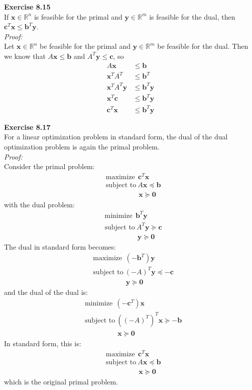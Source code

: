 \documentclass[letterpaper,12pt]{article}
\let\vec\mathbf
\theoremstyle{definition}
\begin{document}
\textbf{Exercise 8.15} \\
If $\vec{x} \in \mathbb{R}^n$ is feasible for the primal and $\vec{y} \in \mathbb{R}^m$ is feasible for the dual, then $\vec{c}^T\vec{x} \leq \vec{b}^T\vec{y}$. \\
\textit{Proof:} \\
Let $\vec{x} \in \mathbb{R}^n$ be feasible for the primal and $\vec{y} \in \mathbb{R}^m$ be feasible for the dual. Then we know that $A\vec{x} \leq \vec{b}$ and $A^T\vec{y} \leq \vec{c}$, so
\begin{align*}
  A\vec{x} &\leq \vec{b} \\
  \vec{x}^TA^T &\leq \vec{b}^T \\
  \vec{x}^TA^T\vec{y} &\leq \vec{b}^T\vec{y} \\
  \vec{x}^T\vec{c} &\leq \vec{b}^T\vec{y} \\
  \vec{c}^T\vec{x} &\leq \vec{b}^T\vec{y}
\end{align*}

\textbf{Exercise 8.17} \\
For a linear optimization problem in standard form, the dual of the dual optimization problem is again the primal problem. \\
\textit{Proof:} \\
Consider the primal problem:
\begin{align*}
  &\text{maximize} \ \ \vec{c}^T\vec{x} \\
  &\text{subject to} \ A\vec{x} \preceq \vec{b} \\
  &\qquad \qquad \ \ \ \vec{x} \succeq \vec{0}
\end{align*}
with the dual problem:
\begin{align*}
  &\text{minimize} \ \ \vec{b}^T\vec{y} \\
  &\text{subject to} \ A^T\vec{y} \succeq \vec{c} \\
  &\qquad \qquad \ \ \ \vec{y} \succeq \vec{0}
\end{align*}
The dual in standard form becomes:
\begin{align*}
  &\text{maximize} \ \ (-\vec{b}^T)\vec{y} \\
  &\text{subject to} \ (-A)^T\vec{y} \preceq -\vec{c} \\
  &\qquad \qquad \ \ \ \vec{y} \succeq \vec{0}
\end{align*}
and the dual of the dual is:
\begin{align*}
  &\text{minimize} \ \ (-\vec{c}^T)\vec{x} \\
  &\text{subject to} \ ((-A)^T)^T\vec{x} \succeq -\vec{b} \\
  &\qquad \qquad \ \ \ \vec{x} \succeq \vec{0}
\end{align*}
In standard form, this is:
\begin{align*}
  &\text{maximize} \ \ \vec{c}^T\vec{x} \\
  &\text{subject to} \ A\vec{x} \preceq \vec{b} \\
  &\qquad \qquad \ \ \ \vec{x} \succeq \vec{0}
\end{align*}
which is the original primal problem. \\
\end{document}
